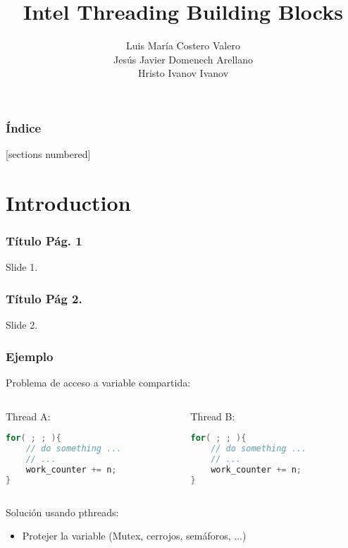 \documentclass[10pt]{beamer}
\title{Intel Threading Building Blocks}
\date{}%
\author{Luis María Costero Valero\\Jesús Javier Domenech Arellano\\Hristo
  Ivanov Ivanov}
\institute{23 Noviembre 2015}
\begin{document}
\maketitle


\begin{frame}
  \frametitle{Índice}
  [sections numbered]
  \tableofcontents[hideallsubsections]
\end{frame}

\section{Introduction} %

\begin{frame}
  \frametitle{Título Pág. 1}
  Slide 1.
\end{frame}

\begin{frame}
  \frametitle{Título Pág 2.}
  Slide 2.
\end{frame}


\begin{frame}[fragile] %
  \frametitle{Ejemplo}
  \alert{Problema} de acceso a variable compartida:
  \begin{columns}
    \begin{column}{0.45\textwidth}
      \center Thread A:
      \begin{lstlisting}[language=C++, frame=single]
for( ; ; ){
    // do something ...
    // ...
    work_counter += n;
}
      \end{lstlisting}
    \end{column}
    \begin{column}{0.45\textwidth}
      \center Thread B:
      \begin{lstlisting}[language=C++, frame=single]
for( ; ; ){
    // do something ...
    // ...
    work_counter += n;
}
      \end{lstlisting}
    \end{column}
  \end{columns}
  \alert{Solución} usando pthreads:
  \begin{itemize}
  \item Protejer la variable (Mutex, cerrojos, semáforos, ...)
  \end{itemize}
\end{frame}
\end{document}
